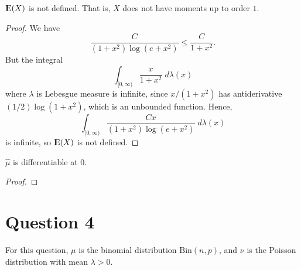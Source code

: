\documentclass{unswmaths}
\begin{document}
\begin{lemma}
    ${\rm I\kern-.3em E}(X)$ is not defined. That is, $X$ does not have moments up
    to order $1$.
\end{lemma}
\begin{proof}
    We have
    \begin{equation*}
        \frac{C}{(1+x^2)\log(e+x^2)}\leq \frac{C}{1+x^2}.
    \end{equation*}
    But the integral
    \begin{equation*}
        \int_{[0,\infty)} \frac{x}{1+x^2}\;d\lambda(x)
    \end{equation*}
    where $\lambda$ is Lebesgue measure is infinite, since
    $x/(1+x^2)$ has antiderivative $(1/2)\log(1+x^2)$, which is an unbounded function.
    Hence,
    \begin{equation*}
        \int_{[0,\infty)} \frac{Cx}{(1+x^2)\log(e+x^2)}\;d\lambda(x)
    \end{equation*}
    is infinite, so ${\rm I\kern-.3em E}(X)$ is not defined.
\end{proof}
    
\begin{lemma}
    $\hat{\mu}$ is differentiable at $0$.
\end{lemma}
\begin{proof}
    
\end{proof}

\section*{Question 4}
For this question, $\mu$ is the binomial distribution $\mathrm{Bin}(n,p)$,
and $\nu$ is the Poisson distribution with mean $\lambda > 0$.
\end{document}
